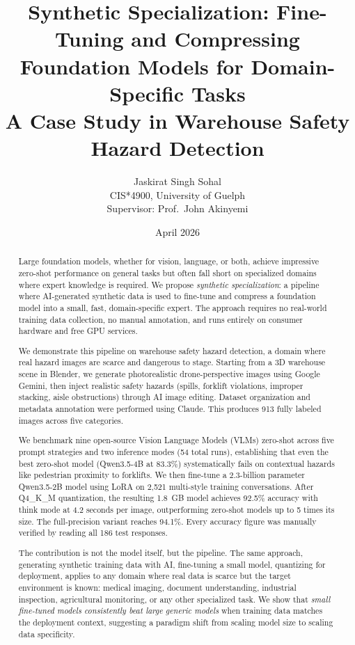 \documentclass[12pt, a4paper]{article}
\title{\textbf{Synthetic Specialization: Fine-Tuning and Compressing Foundation Models for Domain-Specific Tasks} \\ \large A Case Study in Warehouse Safety Hazard Detection}
\author{Jaskirat Singh Sohal \\ CIS*4900, University of Guelph \\ Supervisor: Prof.\ John Akinyemi}
\date{April 2026}
\begin{document}
\maketitle

\begin{abstract}

Large foundation models, whether for vision, language, or both, achieve impressive zero-shot performance on general tasks but often fall short on specialized domains where expert knowledge is required. We propose \textit{synthetic specialization}: a pipeline where AI-generated synthetic data is used to fine-tune and compress a foundation model into a small, fast, domain-specific expert. The approach requires no real-world training data collection, no manual annotation, and runs entirely on consumer hardware and free GPU services.

We demonstrate this pipeline on warehouse safety hazard detection, a domain where real hazard images are scarce and dangerous to stage. Starting from a 3D warehouse scene in Blender, we generate photorealistic drone-perspective images using Google Gemini, then inject realistic safety hazards (spills, forklift violations, improper stacking, aisle obstructions) through AI image editing. Dataset organization and metadata annotation were performed using Claude. This produces 913 fully labeled images across five categories.

We benchmark nine open-source Vision Language Models (VLMs) zero-shot across five prompt strategies and two inference modes (54 total runs), establishing that even the best zero-shot model (Qwen3.5-4B at 83.3\%) systematically fails on contextual hazards like pedestrian proximity to forklifts. We then fine-tune a 2.3-billion parameter Qwen3.5-2B model using LoRA on 2,521 multi-style training conversations. After Q4\_K\_M quantization, the resulting 1.8~GB model achieves 92.5\% accuracy with think mode at 4.2 seconds per image, outperforming zero-shot models up to 5 times its size. The full-precision variant reaches 94.1\%. Every accuracy figure was manually verified by reading all 186 test responses.

The contribution is not the model itself, but the pipeline. The same approach, generating synthetic training data with AI, fine-tuning a small model, quantizing for deployment, applies to any domain where real data is scarce but the target environment is known: medical imaging, document understanding, industrial inspection, agricultural monitoring, or any other specialized task. We show that \textit{small fine-tuned models consistently beat large generic models} when training data matches the deployment context, suggesting a paradigm shift from scaling model size to scaling data specificity.
\end{abstract}
\end{document}
